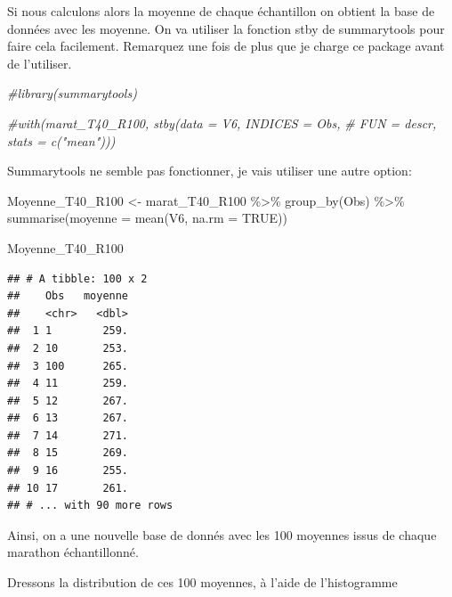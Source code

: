 \documentclass[
]{article}
\newenvironment{Shaded}{\begin{snugshade}}{\end{snugshade}}
\newcommand{\AttributeTok}[1]{\textcolor[rgb]{0.77,0.63,0.00}{#1}}
\newcommand{\CommentTok}[1]{\textcolor[rgb]{0.56,0.35,0.01}{\textit{#1}}}
\newcommand{\ConstantTok}[1]{\textcolor[rgb]{0.00,0.00,0.00}{#1}}
\newcommand{\FunctionTok}[1]{\textcolor[rgb]{0.00,0.00,0.00}{#1}}
\newcommand{\NormalTok}[1]{#1}
\newcommand{\OtherTok}[1]{\textcolor[rgb]{0.56,0.35,0.01}{#1}}
\newcommand{\SpecialCharTok}[1]{\textcolor[rgb]{0.00,0.00,0.00}{#1}}
\begin{document}
Si nous calculons alors la moyenne de chaque échantillon on obtient la
base de données avec les moyenne. On va utiliser la fonction stby de
summarytools pour faire cela facilement. Remarquez une fois de plus que
je charge ce package avant de l'utiliser.

\begin{Shaded}
\begin{Highlighting}[]
\CommentTok{\#library(summarytools)}

\CommentTok{\#with(marat\_T40\_R100, stby(data = V6, INDICES = Obs,}
\CommentTok{\#     FUN = descr, stats = c("mean")))}
\end{Highlighting}
\end{Shaded}

Summarytools ne semble pas fonctionner, je vais utiliser une autre
option:

\begin{Shaded}
\begin{Highlighting}[]
\NormalTok{Moyenne\_T40\_R100 }\OtherTok{\textless{}{-}}
\NormalTok{  marat\_T40\_R100 }\SpecialCharTok{\%\textgreater{}\%} 
  \FunctionTok{group\_by}\NormalTok{(Obs) }\SpecialCharTok{\%\textgreater{}\%} 
  \FunctionTok{summarise}\NormalTok{(}\AttributeTok{moyenne =} \FunctionTok{mean}\NormalTok{(V6, }\AttributeTok{na.rm =} \ConstantTok{TRUE}\NormalTok{)) }

\NormalTok{Moyenne\_T40\_R100}
\end{Highlighting}
\end{Shaded}

\begin{verbatim}
## # A tibble: 100 x 2
##    Obs   moyenne
##    <chr>   <dbl>
##  1 1        259.
##  2 10       253.
##  3 100      265.
##  4 11       259.
##  5 12       267.
##  6 13       267.
##  7 14       271.
##  8 15       269.
##  9 16       255.
## 10 17       261.
## # ... with 90 more rows
\end{verbatim}

Ainsi, on a une nouvelle base de donnés avec les 100 moyennes issus de
chaque marathon échantillonné.

Dressons la distribution de ces 100 moyennes, à l'aide de l'histogramme

\begin{Shaded}
\end{Shaded}
\end{document}

